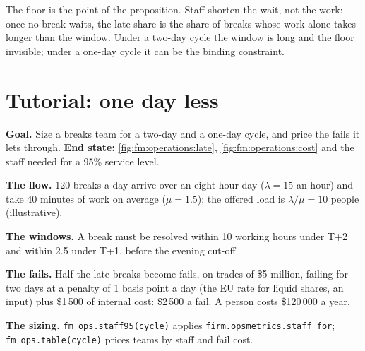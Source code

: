 \label{lst:fm:operations:late}

The floor is the point of the proposition. Staff shorten the wait, not the work: once no break waits, the late share is the share of breaks whose
work alone takes longer than the window. Under a two-day cycle the window is long and the floor invisible; under a one-day cycle it can be the
binding constraint.

\section{Tutorial: one day less}\label{tut:fm:operations:tut}

\begin{tutorial}
\textbf{Goal.} Size a breaks team for a two-day and a one-day cycle, and price the fails it lets through. \textbf{End state:}
\cref{fig:fm:operations:late}, \cref{fig:fm:operations:cost} and the staff needed for a 95\% service level.
\begin{tutsteps}
\item \textbf{The flow.} 120 breaks a day arrive over an eight-hour day ($\lambda=15$ an hour) and take 40 minutes of work on average ($\mu=1.5$);
the offered load is $\lambda/\mu=10$ people (illustrative).
\item \textbf{The windows.} A break must be resolved within 10 working hours under T+2 and within 2.5 under T+1, before the evening cut-off.
\item \textbf{The fails.} Half the late breaks become fails, on trades of \$5 million, failing for two days at a penalty of 1 basis point a day
(the EU rate for liquid shares, an input) plus \$1\,500 of internal cost: \$2\,500 a fail. A person costs \$120\,000 a year.
\item \textbf{The sizing.} \texttt{fm\_ops.staff95(cycle)} applies \texttt{firm.opsmetrics.staff\_for}; \texttt{fm\_ops.table(cycle)} prices
teams by staff and fail cost.
\end{tutsteps}
\end{tutorial}

